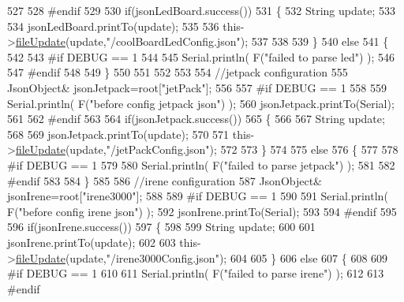 \begin{DoxyCode}
527 
528 \textcolor{preprocessor}{#endif}
529 
530     \textcolor{keywordflow}{if}(jsonLedBoard.success())
531     \{   
532         String update;
533     
534         jsonLedBoard.printTo(update);
535 
536         this->\hyperlink{class_cool_file_system_a13f2958f5b87757c31fc53797a30d23a}{fileUpdate}(update,\textcolor{stringliteral}{"/coolBoardLedConfig.json"});      
537 
538     
539     \}
540     \textcolor{keywordflow}{else}
541     \{
542     
543 \textcolor{preprocessor}{    #if DEBUG == 1 }
544 
545         Serial.println( F(\textcolor{stringliteral}{"failed to parse led"}) );
546     
547 \textcolor{preprocessor}{    #endif }
548 
549     \}
550         
551 
552     
553 
554     \textcolor{comment}{//jetpack configuration}
555         JsonObject& jsonJetpack=root[\textcolor{stringliteral}{"jetPack"}];
556 
557 \textcolor{preprocessor}{#if DEBUG == 1 }
558 
559     Serial.println( F(\textcolor{stringliteral}{"before config jetpack json"}) );
560     jsonJetpack.printTo(Serial);
561 
562 \textcolor{preprocessor}{#endif}
563 
564     \textcolor{keywordflow}{if}(jsonJetpack.success())
565     \{
566     
567         String update;
568     
569         jsonJetpack.printTo(update);
570 
571         this->\hyperlink{class_cool_file_system_a13f2958f5b87757c31fc53797a30d23a}{fileUpdate}(update,\textcolor{stringliteral}{"/jetPackConfig.json"});       
572 
573     \}
574 
575     \textcolor{keywordflow}{else}
576     \{
577     
578 \textcolor{preprocessor}{    #if DEBUG == 1 }
579 
580         Serial.println( F(\textcolor{stringliteral}{"failed to parse jetpack"}) ); 
581     
582 \textcolor{preprocessor}{    #endif}
583 
584     \}
585     
586     \textcolor{comment}{//irene configuration   }
587         JsonObject& jsonIrene=root[\textcolor{stringliteral}{"irene3000"}];
588     
589 \textcolor{preprocessor}{#if DEBUG == 1 }
590 
591     Serial.println( F(\textcolor{stringliteral}{"before config irene json"}) );    
592     jsonIrene.printTo(Serial);
593 
594 \textcolor{preprocessor}{#endif }
595 
596     \textcolor{keywordflow}{if}(jsonIrene.success())
597     \{
598 
599         String update;
600     
601         jsonIrene.printTo(update);
602 
603         this->\hyperlink{class_cool_file_system_a13f2958f5b87757c31fc53797a30d23a}{fileUpdate}(update,\textcolor{stringliteral}{"/irene3000Config.json"});     
604     
605     \}
606     \textcolor{keywordflow}{else}
607     \{
608     
609 \textcolor{preprocessor}{    #if DEBUG == 1 }
610 
611         Serial.println( F(\textcolor{stringliteral}{"failed to parse irene"}) );   
612     
613 \textcolor{preprocessor}{    #endif }

\end{DoxyCode}
